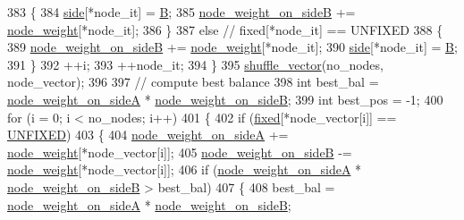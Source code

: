 \begin{DoxyCode}
383     \{
384         \mbox{\hyperlink{classfm__partition_af83309e781e9658fc0ff923ced087bfc}{side}}[*node\_it] = \mbox{\hyperlink{classfm__partition_a42515c44eecb7ba3e2ec549a877ef238}{B}};
385         \mbox{\hyperlink{classfm__partition_a6dc967e385b31096a85f17c51f1f0824}{node\_weight\_on\_sideB}} += \mbox{\hyperlink{classfm__partition_ae1ba643b4bd6721075ab7b608bcf3cd6}{node\_weight}}[*node\_it];
386     \}
387     \textcolor{keywordflow}{else}    \textcolor{comment}{// fixed[*node\_it] == UNFIXED}
388     \{
389         \mbox{\hyperlink{classfm__partition_a6dc967e385b31096a85f17c51f1f0824}{node\_weight\_on\_sideB}} += \mbox{\hyperlink{classfm__partition_ae1ba643b4bd6721075ab7b608bcf3cd6}{node\_weight}}[*node\_it];
390         \mbox{\hyperlink{classfm__partition_af83309e781e9658fc0ff923ced087bfc}{side}}[*node\_it] = \mbox{\hyperlink{classfm__partition_a42515c44eecb7ba3e2ec549a877ef238}{B}};
391     \}
392     ++i;
393     ++node\_it;
394     \}
395     \mbox{\hyperlink{classfm__partition_a27915b38800483f897647f012b935f0a}{shuffle\_vector}}(no\_nodes, node\_vector);
396 
397     \textcolor{comment}{// compute best balance}
398     \textcolor{keywordtype}{int} best\_bal = \mbox{\hyperlink{classfm__partition_a8a50d15b399c9ed35d6987c8fb68aa2b}{node\_weight\_on\_sideA}} * 
      \mbox{\hyperlink{classfm__partition_a6dc967e385b31096a85f17c51f1f0824}{node\_weight\_on\_sideB}};
399     \textcolor{keywordtype}{int} best\_pos = -1;
400     \textcolor{keywordflow}{for} (i = 0; i < no\_nodes; i++)
401     \{
402     \textcolor{keywordflow}{if} (\mbox{\hyperlink{classfm__partition_a3b04658dbb5b27ddd20194ff74a71082}{fixed}}[*node\_vector[i]] == \mbox{\hyperlink{classfm__partition_a24447561db0ea633212c597c5e1fca56}{UNFIXED}})
403     \{
404         \mbox{\hyperlink{classfm__partition_a8a50d15b399c9ed35d6987c8fb68aa2b}{node\_weight\_on\_sideA}} += \mbox{\hyperlink{classfm__partition_ae1ba643b4bd6721075ab7b608bcf3cd6}{node\_weight}}[*node\_vector[i]];
405         \mbox{\hyperlink{classfm__partition_a6dc967e385b31096a85f17c51f1f0824}{node\_weight\_on\_sideB}} -= \mbox{\hyperlink{classfm__partition_ae1ba643b4bd6721075ab7b608bcf3cd6}{node\_weight}}[*node\_vector[i]];
406         \textcolor{keywordflow}{if} (\mbox{\hyperlink{classfm__partition_a8a50d15b399c9ed35d6987c8fb68aa2b}{node\_weight\_on\_sideA}} * \mbox{\hyperlink{classfm__partition_a6dc967e385b31096a85f17c51f1f0824}{node\_weight\_on\_sideB}} > best\_bal)
407         \{
408         best\_bal = \mbox{\hyperlink{classfm__partition_a8a50d15b399c9ed35d6987c8fb68aa2b}{node\_weight\_on\_sideA}} * 
      \mbox{\hyperlink{classfm__partition_a6dc967e385b31096a85f17c51f1f0824}{node\_weight\_on\_sideB}};

\end{DoxyCode}
